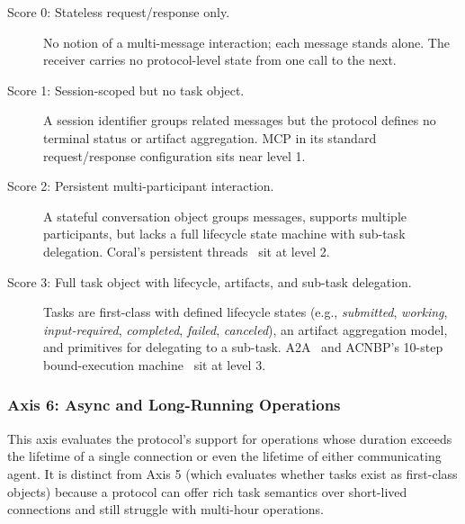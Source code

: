 \begin{description}
  \item[Score 0: Stateless request/response only.] No
    notion of a multi-message interaction; each message
    stands alone. The receiver carries no protocol-level
    state from one call to the next.
  \item[Score 1: Session-scoped but no task object.]
    A session identifier groups related messages but the
    protocol defines no terminal status or artifact
    aggregation. MCP in its standard request/response
    configuration sits near level 1.
  \item[Score 2: Persistent multi-participant
    interaction.] A stateful conversation object groups
    messages, supports multiple participants, but lacks a
    full lifecycle state machine with sub-task
    delegation. Coral's persistent threads~\cite{spec_coral}
    sit at level 2.
  \item[Score 3: Full task object with lifecycle,
    artifacts, and sub-task delegation.] Tasks are
    first-class with defined lifecycle states (e.g.,
    \emph{submitted}, \emph{working}, \emph{input-required},
    \emph{completed}, \emph{failed}, \emph{canceled}), an
    artifact aggregation model, and primitives for
    delegating to a sub-task. A2A~\cite{spec_a2a} and
    ACNBP's 10-step bound-execution
    machine~\cite{spec_acnbp} sit at level 3.
\end{description}

\subsubsection{Axis 6: Async and Long-Running Operations}
\label{sec:rubric:axis6}

This axis evaluates the protocol's support for operations
whose duration exceeds the lifetime of a single connection
or even the lifetime of either communicating agent. It is
distinct from Axis 5 (which evaluates whether tasks exist
as first-class objects) because a protocol can offer rich
task semantics over short-lived connections and still
struggle with multi-hour operations.

